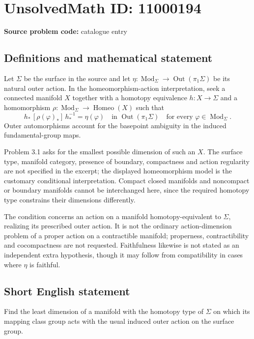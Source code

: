 \documentclass[11pt]{article}
\begin{document}
\section*{UnsolvedMath ID: 11000194}
\textbf{Source problem code:} catalogue entry
\subsection{Definitions and mathematical statement}
Let $\Sigma$ be the surface in the source and let $\eta:\operatorname{Mod}_\Sigma\to\operatorname{Out}(\pi_1\Sigma)$ be its natural outer action. In the homeomorphism-action interpretation, seek a connected manifold $X$ together with a homotopy equivalence $h:X\to\Sigma$ and a homomorphism $\rho:\operatorname{Mod}_\Sigma\to\operatorname{Homeo}(X)$ such that
\[
 h_*\,[\rho(\varphi)_*]\,h_*^{-1}=\eta(\varphi)
 \quad\text{in }\operatorname{Out}(\pi_1\Sigma)
 \quad\text{for every }\varphi\in\operatorname{Mod}_\Sigma.
\]
Outer automorphisms account for the basepoint ambiguity in the induced fundamental-group maps.

Problem 3.1 asks for the smallest possible dimension of such an $X$. The surface type, manifold category, presence of boundary, compactness and action regularity are not specified in the excerpt; the displayed homeomorphism model is the customary conditional interpretation. Compact closed manifolds and noncompact or boundary manifolds cannot be interchanged here, since the required homotopy type constrains their dimensions differently.

The condition concerns an action on a manifold homotopy-equivalent to $\Sigma$, realizing its prescribed outer action. It is not the ordinary action-dimension problem of a proper action on a contractible manifold; properness, contractibility and cocompactness are not requested. Faithfulness likewise is not stated as an independent extra hypothesis, though it may follow from compatibility in cases where $\eta$ is faithful.
\subsection{Short English statement}
Find the least dimension of a manifold with the homotopy type of $\Sigma$ on which its mapping class group acts with the usual induced outer action on the surface group.
\end{document}

